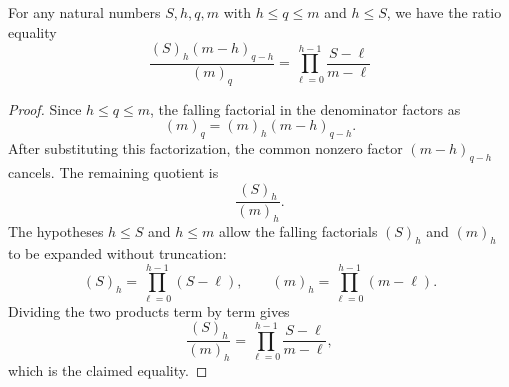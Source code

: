 \begin{lemma}
For any natural numbers \(S,h,q,m\) with \(h\le q\le m\) and \(h\le S\),
we have the ratio equality
\[
\frac{(S)_h (m-h)_{q-h}}{(m)_q} = \prod_{\ell=0}^{h-1} \frac{S-\ell}{m-\ell}
\]
\end{lemma}
\begin{proof}
Since \(h\le q\le m\), the falling factorial in the denominator factors as
\[
(m)_q=(m)_h(m-h)_{q-h}.
\]
After substituting this factorization, the common nonzero factor
\((m-h)_{q-h}\) cancels.  The remaining quotient is
\[
\frac{(S)_h}{(m)_h}.
\]
The hypotheses \(h\le S\) and \(h\le m\) allow the falling factorials
\((S)_h\) and \((m)_h\) to be expanded without truncation:
\[
(S)_h=\prod_{\ell=0}^{h-1}(S-\ell),\qquad
(m)_h=\prod_{\ell=0}^{h-1}(m-\ell).
\]
Dividing the two products term by term gives
\[
\frac{(S)_h}{(m)_h}
=\prod_{\ell=0}^{h-1}\frac{S-\ell}{m-\ell},
\]
which is the claimed equality.
\end{proof}
